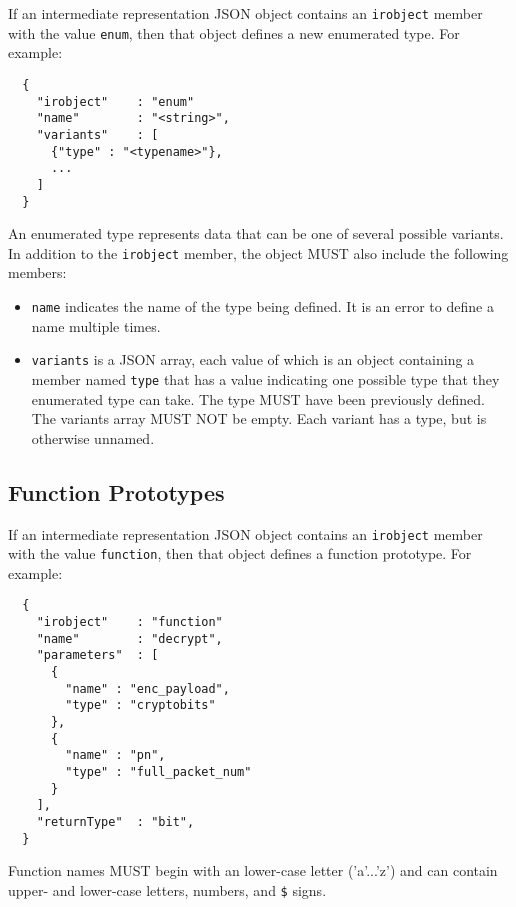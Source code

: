 \documentclass[10pt,twocolumn,a4paper]{article}
\begin{document}
If an intermediate representation JSON object contains an \texttt{irobject}
member with the value \texttt{enum}, then that object defines a new enumerated
type. For example:

\begin{verbatim}
  {
    "irobject"    : "enum"
    "name"        : "<string>",
    "variants"    : [
      {"type" : "<typename>"},
      ...
    ]
  }
\end{verbatim}

An enumerated type represents data that can be one of several possible
variants. In addition to the \texttt{irobject} member, the object MUST
also include the following members:
\begin{itemize}
  \item \texttt{name} indicates the name of the type being defined. It is
    an error to define a name multiple times.
  \item \texttt{variants} is a JSON array, each value of which is an object
    containing a member named \texttt{type} that has a value indicating one
    possible type that they enumerated type can take. The type MUST have
    been previously defined.  The variants array MUST NOT be empty. Each
    variant has a type, but is otherwise unnamed.
\end{itemize}

\subsection{Function Prototypes}
\label{sec:funcs}

If an intermediate representation JSON object contains an \texttt{irobject}
member with the value \texttt{function}, then that object defines a function
prototype. For example:

\begin{verbatim}
  {
    "irobject"    : "function"
    "name"        : "decrypt",
    "parameters"  : [
      {
        "name" : "enc_payload",
        "type" : "cryptobits"
      },
      {
        "name" : "pn",
        "type" : "full_packet_num"
      }
    ],
    "returnType"  : "bit",
  }
\end{verbatim}

Function names MUST begin with an lower-case letter ('a'...'z') and can contain
upper- and lower-case letters, numbers, and \verb|$| signs.

\end{document}
